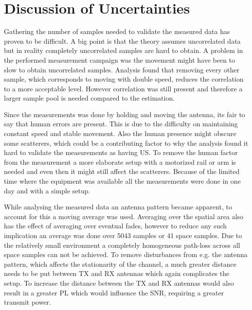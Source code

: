 \chapter{Discussion of Uncertainties}
%
%


Gathering the number of samples needed to validate the measured data has proven to be difficult. A big point is that the theory assumes uncorrelated data but in reality completely uncorrelated samples are hard to obtain. A problem in the performed measurement campaign was the movement might have been to slow to obtain uncorrelated samples. Analysis found that removing every other sample, which corresponds to moving with double speed, reduces the correlation to a more acceptable level. However correlation was still present and therefore a larger sample pool is needed compared to the estimation. 

Since the measurements was done by holding and moving the antenna, its fair to say that human errors are present. This is due to the difficulty on maintaining constant speed and stable movement. Also the human presence might obscure some scatterers, which could be a contributing factor to why the analysis found it hard to validate the measurements as having \gls{US}. To remove the human factor from the measurement a more elaborate setup with a motorized rail or arm is needed and even then it might still affect the scatterers. Because of the limited time where the equipment was available all the measurements were done in one day and with a simple setup.

While analysing the measured data an antenna pattern became apparent, to account for this a moving average was used. Averaging over the spatial area also has the effect of averaging over eventual fades, however to reduce any such implication an average was done over 5043 samples or 41 space samples. Due to the relatively small environment a completely homogeneous path-loss across all space samples can not be achieved. To remove disturbances from e.g. the antenna pattern, which affects the stationarity of the channel, a much greater distance needs to be put between TX and RX antennas which again complicates the setup. To increase the distance between the TX and RX antennas would also result in a greater \gls{PL} which would influence the SNR, requiring a greater transmit power.

